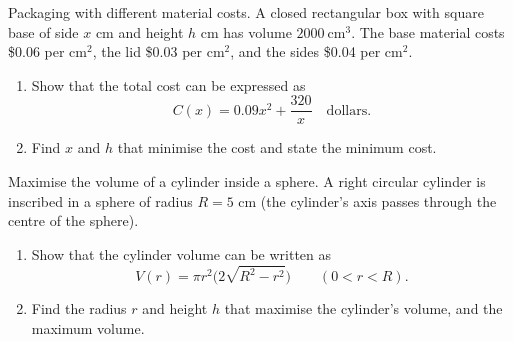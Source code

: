 \documentclass[11pt]{article}
\def\textbf#1{#1}%
\newcounter{question}
\begin{document}
\begin{question}
\textbf{Packaging with different material costs.}
A closed rectangular box with square base of side $x$ cm and height $h$ cm has volume $2000\ \text{cm}^3$.
The base material costs \$0.06 per $\text{cm}^2$, the lid \$0.03 per $\text{cm}^2$, and the sides \$0.04 per $\text{cm}^2$.
\begin{enumerate}
  \item Show that the total cost can be expressed as
  \[
     C(x)=0.09x^2+\frac{320}{x}\quad\text{dollars}.
  \]
  \item Find $x$ and $h$ that minimise the cost and state the minimum cost.
\end{enumerate}

\begin{center}
\end{center}
\end{question}

\begin{question}
\textbf{Maximise the volume of a cylinder inside a sphere.}
A right circular cylinder is inscribed in a sphere of radius $R=5$ cm (the cylinder’s axis passes through the centre of the sphere).
\begin{enumerate}
  \item Show that the cylinder volume can be written as
  \[
    V(r)=\pi r^2\Big(2\sqrt{R^2-r^2}\Big)\qquad (0<r<R).
  \]
  \item Find the radius $r$ and height $h$ that maximise the cylinder’s volume, and the maximum volume.
\end{enumerate}

\begin{center}
\end{center}
\end{question}
\end{document}
